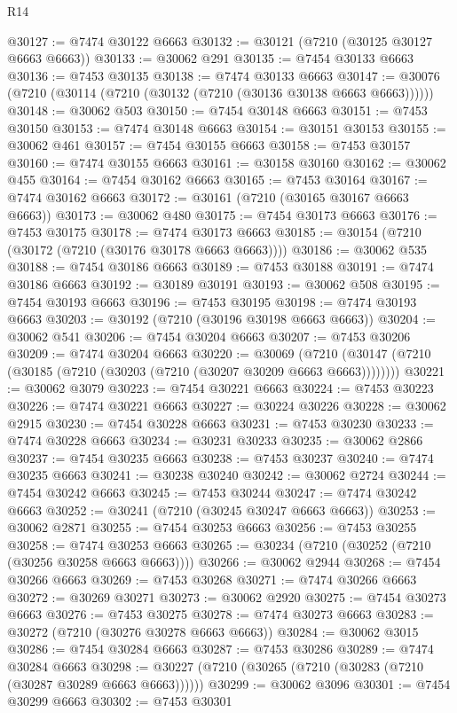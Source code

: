 \begin{lexlean}{R14}
\begin{coremodule}
@30127 := @7474 @30122 @6663
@30132 := @30121 (@7210 (@30125 @30127 @6663 @6663))
@30133 := @30062 @291
@30135 := @7454 @30133 @6663
@30136 := @7453 @30135
@30138 := @7474 @30133 @6663
@30147 := @30076 (@7210 (@30114 (@7210 (@30132 (@7210 (@30136 @30138 @6663 @6663))))))
@30148 := @30062 @503
@30150 := @7454 @30148 @6663
@30151 := @7453 @30150
@30153 := @7474 @30148 @6663
@30154 := @30151 @30153
@30155 := @30062 @461
@30157 := @7454 @30155 @6663
@30158 := @7453 @30157
@30160 := @7474 @30155 @6663
@30161 := @30158 @30160
@30162 := @30062 @455
@30164 := @7454 @30162 @6663
@30165 := @7453 @30164
@30167 := @7474 @30162 @6663
@30172 := @30161 (@7210 (@30165 @30167 @6663 @6663))
@30173 := @30062 @480
@30175 := @7454 @30173 @6663
@30176 := @7453 @30175
@30178 := @7474 @30173 @6663
@30185 := @30154 (@7210 (@30172 (@7210 (@30176 @30178 @6663 @6663))))
@30186 := @30062 @535
@30188 := @7454 @30186 @6663
@30189 := @7453 @30188
@30191 := @7474 @30186 @6663
@30192 := @30189 @30191
@30193 := @30062 @508
@30195 := @7454 @30193 @6663
@30196 := @7453 @30195
@30198 := @7474 @30193 @6663
@30203 := @30192 (@7210 (@30196 @30198 @6663 @6663))
@30204 := @30062 @541
@30206 := @7454 @30204 @6663
@30207 := @7453 @30206
@30209 := @7474 @30204 @6663
@30220 := @30069
    (@7210 (@30147 (@7210 (@30185 (@7210 (@30203 (@7210 (@30207 @30209 @6663 @6663))))))))
@30221 := @30062 @3079
@30223 := @7454 @30221 @6663
@30224 := @7453 @30223
@30226 := @7474 @30221 @6663
@30227 := @30224 @30226
@30228 := @30062 @2915
@30230 := @7454 @30228 @6663
@30231 := @7453 @30230
@30233 := @7474 @30228 @6663
@30234 := @30231 @30233
@30235 := @30062 @2866
@30237 := @7454 @30235 @6663
@30238 := @7453 @30237
@30240 := @7474 @30235 @6663
@30241 := @30238 @30240
@30242 := @30062 @2724
@30244 := @7454 @30242 @6663
@30245 := @7453 @30244
@30247 := @7474 @30242 @6663
@30252 := @30241 (@7210 (@30245 @30247 @6663 @6663))
@30253 := @30062 @2871
@30255 := @7454 @30253 @6663
@30256 := @7453 @30255
@30258 := @7474 @30253 @6663
@30265 := @30234 (@7210 (@30252 (@7210 (@30256 @30258 @6663 @6663))))
@30266 := @30062 @2944
@30268 := @7454 @30266 @6663
@30269 := @7453 @30268
@30271 := @7474 @30266 @6663
@30272 := @30269 @30271
@30273 := @30062 @2920
@30275 := @7454 @30273 @6663
@30276 := @7453 @30275
@30278 := @7474 @30273 @6663
@30283 := @30272 (@7210 (@30276 @30278 @6663 @6663))
@30284 := @30062 @3015
@30286 := @7454 @30284 @6663
@30287 := @7453 @30286
@30289 := @7474 @30284 @6663
@30298 := @30227 (@7210 (@30265 (@7210 (@30283 (@7210 (@30287 @30289 @6663 @6663))))))
@30299 := @30062 @3096
@30301 := @7454 @30299 @6663
@30302 := @7453 @30301

\end{coremodule}
\end{lexlean}
